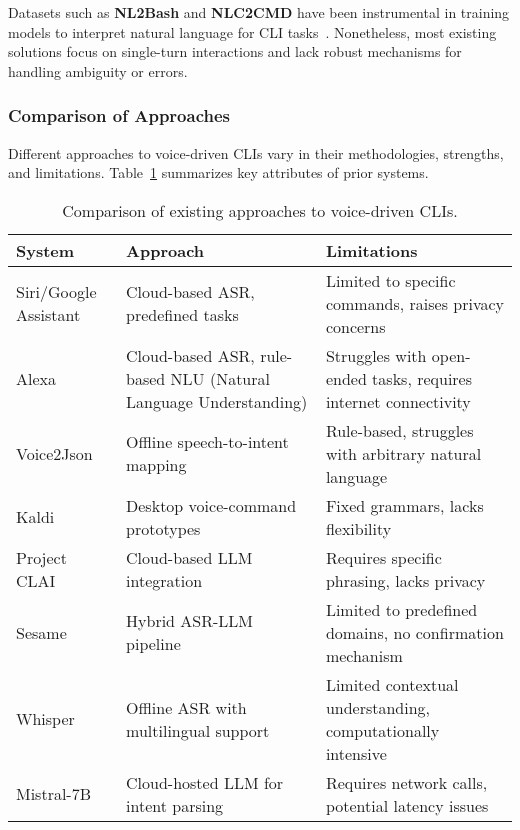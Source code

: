 \documentclass[a4paper,12pt]{article}
\begin{document}
Datasets such as \textbf{NL2Bash} and \textbf{NLC2CMD} have been instrumental in training models to interpret natural language for CLI tasks~\cite{ref26,ref27}. Nonetheless, most existing solutions focus on single-turn interactions and lack robust mechanisms for handling ambiguity or errors.

\subsubsection{Comparison of Approaches}
Different approaches to voice-driven CLIs vary in their methodologies, strengths, and limitations. Table~\ref{tab:relatedwork} summarizes key attributes of prior systems.

\begin{table}[h]
    \centering
    \begin{tabular}{|p{3.5cm}|p{4cm}|p{4cm}|}
        \hline
        \textbf{System} & \textbf{Approach} & \textbf{Limitations} \\ \hline
        Siri/Google Assistant & Cloud-based ASR, predefined tasks & Limited to specific commands, raises privacy concerns~\cite{ref7} \\ \hline
        Alexa & Cloud-based ASR, rule-based NLU (Natural Language Understanding) & Struggles with open-ended tasks, requires internet connectivity~\cite{ref7} \\ \hline
        Voice2Json & Offline speech-to-intent mapping & Rule-based, struggles with arbitrary natural language~\cite{ref5} \\ \hline
        Kaldi & Desktop voice-command prototypes & Fixed grammars, lacks flexibility~\cite{ref5} \\ \hline
        Project CLAI & Cloud-based LLM integration & Requires specific phrasing, lacks privacy~\cite{ref29} \\ \hline
        Sesame & Hybrid ASR-LLM pipeline & Limited to predefined domains, no confirmation mechanism~\cite{ref30} \\ \hline
        Whisper & Offline ASR with multilingual support & Limited contextual understanding, computationally intensive~\cite{ref10} \\ \hline
        Mistral-7B & Cloud-hosted LLM for intent parsing & Requires network calls, potential latency issues~\cite{ref11} \\ \hline
    \end{tabular}
    \caption{Comparison of existing approaches to voice-driven CLIs.}
    \label{tab:relatedwork}
\end{table}
\end{document}
